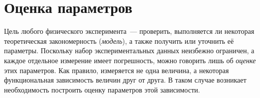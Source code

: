 \chapter{Оценка параметров}
\label{ch:estimate}


Цель любого физического эксперимента~--- проверить, выполняется ли некоторая
теоретическая закономерность (\emph{модель}), а также получить или уточнить
её параметры. Поскольку набор экспериментальных данных неизбежно ограничен,
а каждое отдельное измерение имеет погрешность, можно говорить лишь
об \emph{оценке} этих параметров. Как правило, измеряется не одна
величина, а некоторая функциональная зависимость величин друг от друга.
В таком случае возникает необходимость построить оценку параметров этой зависимости.


%

